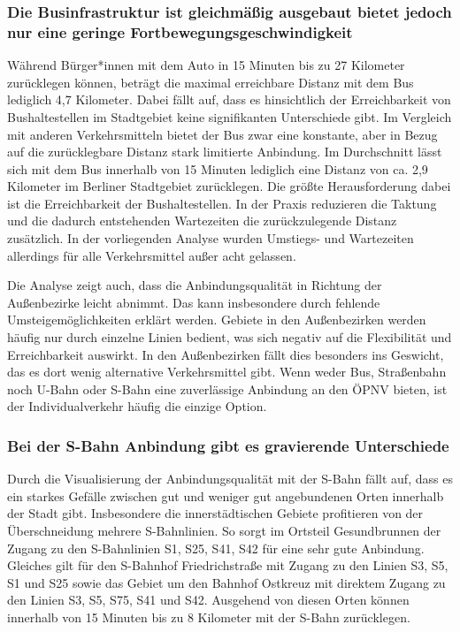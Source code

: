 \subsubsection{Die Businfrastruktur ist gleichmäßig ausgebaut bietet jedoch nur eine geringe Fortbewegungsgeschwindigkeit}
Während Bürger*innen mit dem Auto in 15 Minuten bis zu 27 Kilometer zurücklegen können, beträgt die maximal erreichbare Distanz mit dem Bus lediglich 4,7 Kilometer. Dabei fällt auf, dass es hinsichtlich der Erreichbarkeit von Bushaltestellen im Stadtgebiet keine signifikanten Unterschiede gibt. Im Vergleich mit anderen Verkehrsmitteln bietet der Bus zwar eine konstante, aber in Bezug auf die zurücklegbare Distanz stark limitierte Anbindung. Im Durchschnitt lässt sich mit dem Bus innerhalb von 15 Minuten lediglich eine Distanz von ca. 2,9 Kilometer im Berliner Stadtgebiet zurücklegen. Die größte Herausforderung dabei ist die Erreichbarkeit der Bushaltestellen. In der Praxis reduzieren die Taktung und die dadurch entstehenden Wartezeiten die zurückzulegende Distanz zusätzlich. In der vorliegenden Analyse wurden Umstiegs- und Wartezeiten allerdings für alle Verkehrsmittel außer acht gelassen.

Die Analyse zeigt auch, dass die Anbindungsqualität in Richtung der Außenbezirke leicht abnimmt. Das kann insbesondere durch fehlende Umsteigemöglichkeiten erklärt werden. Gebiete in den Außenbezirken werden häufig nur durch einzelne Linien bedient, was sich negativ auf die Flexibilität und Erreichbarkeit auswirkt. In den Außenbezirken fällt dies besonders ins Geswicht, das es dort wenig alternative Verkehrsmittel gibt. Wenn weder Bus, Straßenbahn noch U-Bahn oder S-Bahn eine zuverlässige Anbindung an den ÖPNV bieten, ist der Individualverkehr häufig die einzige Option.








\subsubsection{Bei der S-Bahn Anbindung gibt es gravierende Unterschiede}
Durch die Visualisierung der Anbindungsqualität mit der S-Bahn fällt auf, dass es ein starkes Gefälle zwischen gut und weniger gut angebundenen Orten innerhalb der Stadt gibt. Insbesondere die innerstädtischen Gebiete profitieren von der Überschneidung mehrere S-Bahnlinien. So sorgt im Ortsteil Gesundbrunnen der Zugang zu den S-Bahnlinien S1, S25, S41, S42 für eine sehr gute Anbindung. Gleiches gilt für den S-Bahnhof Friedrichstraße mit Zugang zu den Linien S3, S5, S1 und S25 sowie das Gebiet um den Bahnhof Ostkreuz mit direktem Zugang zu den Linien S3, S5, S75, S41 und S42. Ausgehend von diesen Orten können innerhalb von 15 Minuten bis zu 8 Kilometer mit der S-Bahn zurücklegen.

